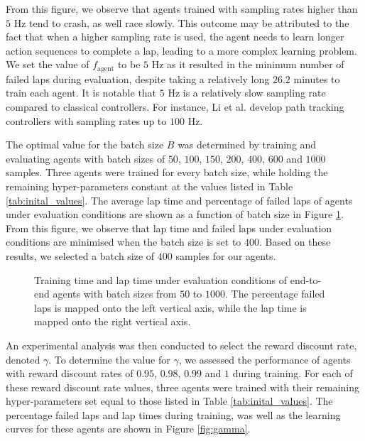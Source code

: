 From this figure, we observe that agents trained with sampling rates higher than $5$ Hz tend to crash, as well race slowly.
This outcome may be attributed to the fact that when a higher sampling rate is used, the agent needs to learn longer action sequences to complete a lap, leading to a more complex learning problem. 
We set the value of $f_{\text{agent}}$ to be $5$ Hz as it resulted in the minimum number of failed laps during evaluation, despite taking a relatively long $26.2$ minutes to train each agent.
It is notable that $5$ Hz is a relatively slow sampling rate compared to classical controllers.
For instance, Li et al. \cite{Li2019} develop path tracking controllers with sampling rates up to $100$ Hz.


The optimal value for the batch size $B$ was determined by training and evaluating agents with batch sizes of $50$, $100$, $150$, $200$, $400$, $600$ and $1000$ samples.
Three agents were trained for every batch size, while holding the remaining hyper-parameters constant at the values listed in Table \ref{tab:inital_values}.
The average lap time and percentage of failed laps of agents under evaluation conditions are shown as a function of batch size in Figure \ref{fig:batch_size}.
From this figure, we observe that lap time and failed laps under evaluation conditions are minimised when the batch size is set to $400$.
Based on these results, we selected a batch size of $400$ samples for our agents.

\begin{figure}[htb!]
    \centering
    
    \caption[Training time and lap time under evaluation conditions of end-to-end agents with various batch sizes]{Training time and lap time under evaluation conditions of end-to-end agents with batch sizes from $50$ to $1000$. The percentage failed laps is mapped onto the left vertical axis, while the lap time is mapped onto the right vertical axis.}
    \label{fig:batch_size}
\end{figure}


An experimental analysis was then conducted to select the reward discount rate, denoted $\gamma$. 
To determine the value for $\gamma$, we assessed the performance of agents with reward discount rates of $0.95$, $0.98$, $0.99$ and $1$ during training.
For each of these reward discount rate values, three agents were trained with their remaining hyper-parameters set equal to those listed in Table \ref{tab:inital_values}.
The percentage failed laps and lap times during training, was well as the learning curves for these agents are shown in Figure \ref{fig:gamma}.

